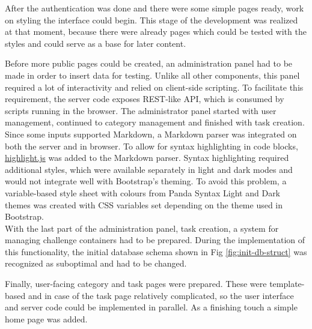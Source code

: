 After the authentication was done and there were some simple pages ready, work on styling the interface could begin. This stage of the development was realized at that moment, because there were already pages which could be tested with the styles and could serve as a base for later content.

Before more public pages could be created, an administration panel had to be made in order to insert data for testing. Unlike all other components, this panel required a lot of interactivity and relied on client-side scripting. To facilitate this requirement, the server code exposes REST-like API, which is consumed by scripts running in the browser. The administrator panel started with user management, continued to category management and finished with task creation.\\
Since some inputs supported Markdown, a Markdown parser was integrated on both the server and in browser. To allow for syntax highlighting in code blocks, \href{https://highlightjs.org}{highlight.js} was added to the Markdown parser. Syntax highlighting required additional styles, which were available separately in light and dark modes and would not integrate well with Bootstrap's theming. To avoid this problem, a variable-based style sheet with colours from Panda Syntax Light and Dark themes was created with CSS variables set depending on the theme used in Bootstrap.\\
With the last part of the administration panel, task creation, a system for managing challenge containers had to be prepared. During the implementation of this functionality, the initial database schema shown in Fig \ref{fig:init-db-struct} was recognized as suboptimal and had to be changed.

Finally, user-facing category and task pages were prepared. These were template-based and in case of the task page relatively complicated, so the user interface and server code could be implemented in parallel. As a finishing touch a simple home page was added.
